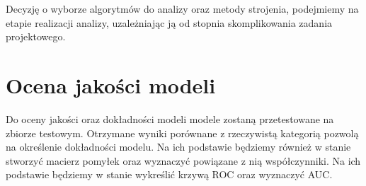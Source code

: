 \documentclass[a4paper,10pt]{article}
\begin{document}
		Decyzję o wyborze algorytmów do analizy oraz metody strojenia, podejmiemy na etapie realizacji analizy, uzależniając ją od stopnia skomplikowania zadania projektowego.
 
 	\section{Ocena jakości modeli}
 		Do oceny jakości oraz dokładności modeli modele zostaną przetestowane na zbiorze testowym. Otrzymane wyniki porównane z rzeczywistą kategorią pozwolą na określenie dokładności modelu. Na ich podstawie będziemy również w stanie stworzyć macierz pomyłek oraz wyznaczyć powiązane z nią współczynniki. Na ich podstawie będziemy w stanie wykreślić krzywą ROC oraz wyznaczyć AUC.
\end{document}
